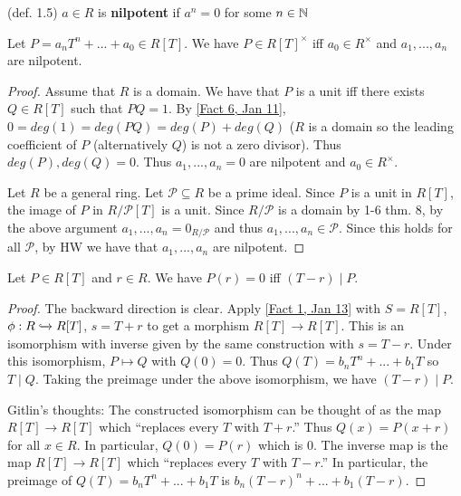 \begin{rmk} (def. 1.5)
$a \in R$ is \textbf{nilpotent} if $a^n = 0$ for some $n \in \mathbb{N}$
\end{rmk}

\begin{prop} \label{Prop 2, Jan 13}
Let $P = a_nT^n + ... + a_0 \in R[T]$.  We have $P \in R[T]^\times$ iff $a_0 \in R^\times$ and $a_1,...,a_n$ are nilpotent.
\end{prop}

\begin{proof} \hspace{0.5cm}

Assume that $R$ is a domain.  We have that $P$ is a unit iff there exists $Q \in R[T]$ such that $PQ = 1$.  By \ref{Fact 6, Jan 11}, $0 = deg(1) = deg(PQ) = deg(P) + deg(Q)$ ($R$ is a domain so the leading coefficient of $P$ (alternatively $Q$) is not a zero divisor).  Thus $deg(P),deg(Q) = 0$.  Thus $a_1,...,a_n = 0$ are nilpotent and $a_0 \in R^\times$.

Let $R$ be a general ring.  Let $\mathcal{P} \subseteq R$ be a prime ideal.  Since $P$ is a unit in $R[T]$, the image of $P$ in $R / \mathcal{P}[T]$ is a unit.  Since $R/\mathcal{P}$ is a domain by 1-6 thm. 8, by the above argument $a_1,...,a_n = 0_{R/\mathcal{P}}$ and thus $a_1,...,a_n \in \mathcal{P}$.  Since this holds for all $\mathcal{P}$, by HW we have that $a_1,...,a_n$ are nilpotent.

\end{proof}

\begin{lemma}\label{Lemma 3, Jan 13}
Let $P \in R[T]$ and $r \in R$.  We have $P(r) = 0$ iff $(T-r) \mid P$.
\end{lemma}

\begin{proof}

The backward direction is clear.  Apply \ref{Fact 1, Jan 13} with $S = R[T]$, $\phi : R \xhookrightarrow{} R[T]$, $s = T+r$ to get a morphism $R[T] \rightarrow R[T]$.  This is an isomorphism with inverse given by the same construction with $s = T-r$.  Under this isomorphism, $P \mapsto Q$ with $Q(0) = 0$.  Thus $Q(T) = b_nT^n + ... + b_1T$ so $T \mid Q$.  Taking the preimage under the above isomorphism, we have $(T-r) \mid P$.

Gitlin's thoughts:  The constructed isomorphism can be thought of as the map $R[T] \rightarrow R[T]$ which ``replaces every $T$ with $T+r$.''  Thus $Q(x) = P(x+r)$ for all $x \in R$.  In particular, $Q(0) = P(r)$ which is $0$.  The inverse map is the map $R[T] \rightarrow R[T]$ which ``replaces every $T$ with $T-r$.''  In particular, the preimage of $Q(T) = b_nT^n + ... + b_1T$ is $b_n(T-r)^n + ... + b_1(T-r)$.

\end{proof}

